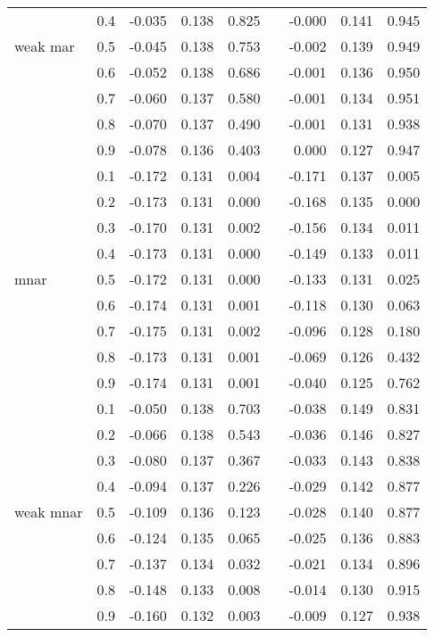 \documentclass[]{interact}
\begin{document}
\begin{table}
{\begin{tabular}{lrrrrrrrr}
   & 0.4 & -0.035 & 0.138 & 0.825 &  & -0.000 & 0.141 & 0.945 \\ 
  weak mar & 0.5 & -0.045 & 0.138 & 0.753 &  & -0.002 & 0.139 & 0.949 \\ 
   & 0.6 & -0.052 & 0.138 & 0.686 &  & -0.001 & 0.136 & 0.950 \\ 
   & 0.7 & -0.060 & 0.137 & 0.580 &  & -0.001 & 0.134 & 0.951 \\ 
   & 0.8 & -0.070 & 0.137 & 0.490 &  & -0.001 & 0.131 & 0.938 \\ 
   & 0.9 & -0.078 & 0.136 & 0.403 &  & 0.000 & 0.127 & 0.947 \\ 
   \cline{2-9}
   & 0.1 & -0.172 & 0.131 & 0.004 &  & -0.171 & 0.137 & 0.005 \\ 
   & 0.2 & -0.173 & 0.131 & 0.000 &  & -0.168 & 0.135 & 0.000 \\ 
   & 0.3 & -0.170 & 0.131 & 0.002 &  & -0.156 & 0.134 & 0.011 \\ 
   & 0.4 & -0.173 & 0.131 & 0.000 &  & -0.149 & 0.133 & 0.011 \\ 
  mnar & 0.5 & -0.172 & 0.131 & 0.000 &  & -0.133 & 0.131 & 0.025 \\ 
   & 0.6 & -0.174 & 0.131 & 0.001 &  & -0.118 & 0.130 & 0.063 \\ 
   & 0.7 & -0.175 & 0.131 & 0.002 &  & -0.096 & 0.128 & 0.180 \\ 
   & 0.8 & -0.173 & 0.131 & 0.001 &  & -0.069 & 0.126 & 0.432 \\ 
   & 0.9 & -0.174 & 0.131 & 0.001 &  & -0.040 & 0.125 & 0.762 \\ 
   \cline{2-9}
   & 0.1 & -0.050 & 0.138 & 0.703 &  & -0.038 & 0.149 & 0.831 \\ 
   & 0.2 & -0.066 & 0.138 & 0.543 &  & -0.036 & 0.146 & 0.827 \\ 
   & 0.3 & -0.080 & 0.137 & 0.367 &  & -0.033 & 0.143 & 0.838 \\ 
   & 0.4 & -0.094 & 0.137 & 0.226 &  & -0.029 & 0.142 & 0.877 \\ 
  weak mnar & 0.5 & -0.109 & 0.136 & 0.123 &  & -0.028 & 0.140 & 0.877 \\ 
   & 0.6 & -0.124 & 0.135 & 0.065 &  & -0.025 & 0.136 & 0.883 \\ 
   & 0.7 & -0.137 & 0.134 & 0.032 &  & -0.021 & 0.134 & 0.896 \\ 
   & 0.8 & -0.148 & 0.133 & 0.008 &  & -0.014 & 0.130 & 0.915 \\ 
   & 0.9 & -0.160 & 0.132 & 0.003 &  & -0.009 & 0.127 & 0.938 \\ 
   \hline
\end{tabular}}
  \label{A}
\end{table}
\end{document}

